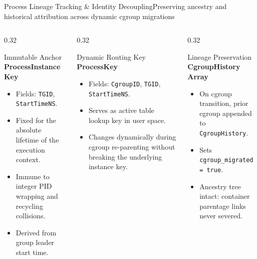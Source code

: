 \documentclass[aspectratio=169,10pt]{beamer}
\begin{document}
\begin{frame}{Process Lineage Tracking \& Identity Decoupling}{Preserving ancestry and historical attribution across dynamic cgroup migrations}
  \begin{columns}[T]
    \begin{column}{0.32\textwidth}
      \begin{block}{Immutable Anchor}
        \scriptsize
        \textbf{ProcessInstanceKey}
        \begin{itemize}
          \item Fields: \texttt{TGID}, \texttt{StartTimeNS}.
          \item Fixed for the absolute lifetime of the execution context.
          \item Immune to integer PID wrapping and recycling collisions.
          \item Derived from group leader start time.
        \end{itemize}
      \end{block}
    \end{column}

    \begin{column}{0.32\textwidth}
      \begin{block}{Dynamic Routing Key}
        \scriptsize
        \textbf{ProcessKey}
        \begin{itemize}
          \item Fields: \texttt{CgroupID}, \texttt{TGID}, \texttt{StartTimeNS}.
          \item Serves as active table lookup key in user space.
          \item Changes dynamically during cgroup re-parenting without breaking the underlying instance key.
        \end{itemize}
      \end{block}
    \end{column}

    \begin{column}{0.32\textwidth}
      \begin{exampleblock}{Lineage Preservation}
        \scriptsize
        \textbf{CgroupHistory Array}
        \begin{itemize}
          \item On cgroup transition, prior cgroup appended to \texttt{CgroupHistory}.
          \item Sets \texttt{cgroup\_migrated = true}.
          \item Ancestry tree intact: container parentage links never severed.
        \end{itemize}
      \end{exampleblock}
    \end{column}
  \end{columns}
\end{frame}
\end{document}
